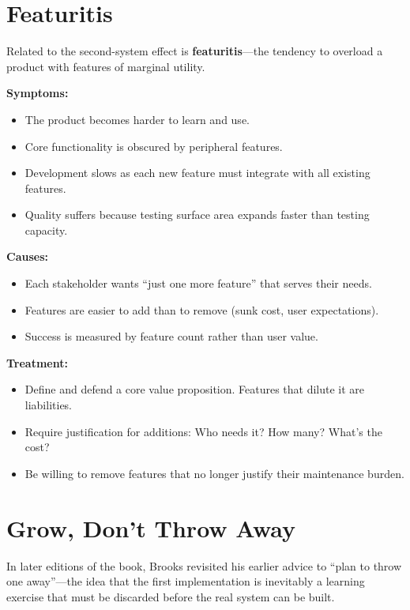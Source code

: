 \documentclass[11pt, letterpaper]{article}
\begin{document}
\vspace{1em}

\section*{Featuritis}

Related to the second-system effect is \textbf{featuritis}---the tendency to overload a product with features of marginal utility.

\textbf{Symptoms:}
\begin{itemize}
    \item The product becomes harder to learn and use.
    \item Core functionality is obscured by peripheral features.
    \item Development slows as each new feature must integrate with all existing features.
    \item Quality suffers because testing surface area expands faster than testing capacity.
\end{itemize}

\textbf{Causes:}
\begin{itemize}
    \item Each stakeholder wants ``just one more feature'' that serves their needs.
    \item Features are easier to add than to remove (sunk cost, user expectations).
    \item Success is measured by feature count rather than user value.
\end{itemize}

\textbf{Treatment:}
\begin{itemize}
    \item Define and defend a core value proposition. Features that dilute it are liabilities.
    \item Require justification for additions: Who needs it? How many? What's the cost?
    \item Be willing to remove features that no longer justify their maintenance burden.
\end{itemize}

\vspace{1em}

\section*{Grow, Don't Throw Away}

In later editions of the book, Brooks revisited his earlier advice to ``plan to throw one away''---the idea that the first implementation is inevitably a learning exercise that must be discarded before the real system can be built.
\end{document}
